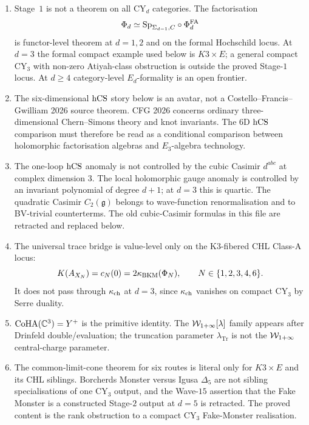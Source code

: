\begin{enumerate}
\item Stage~$1$ is not a theorem on all CY$_d$ categories.  The
factorisation
\[
\Phi_d \simeq \mathrm{Sp}_{\Sigma_{d-1}, C}\circ \Phi^{\mathrm{FA}}_d
\]
is functor-level theorem at $d = 1,2$ and on the formal Hochschild locus.
At $d = 3$ the formal compact example used below is $K3 \times E$; a
general compact CY$_3$ with non-zero Atiyah-class obstruction is outside
the proved Stage-$1$ locus.  At $d \geq 4$ category-level $E_d$-formality
is an open frontier.

\item The six-dimensional $\mathrm{hCS}$ story below is an avatar, not a
Costello--Francis--Gwilliam 2026 source theorem.  CFG 2026 concerns
ordinary three-dimensional Chern--Simons theory and knot invariants.  The
$6$D $\mathrm{hCS}$ comparison must therefore be read as a conditional comparison
between holomorphic factorisation algebras and $E_3$-algebra technology.

\item The one-loop $\mathrm{hCS}$ anomaly is not controlled by the cubic Casimir
$d^{abc}$ at complex dimension $3$.  The local holomorphic gauge anomaly
is controlled by an invariant polynomial of degree $d+1$; at $d=3$ this
is quartic.  The quadratic Casimir $C_2(\mathfrak g)$ belongs to
wave-function renormalisation and to BV-trivial counterterms.  The old
cubic-Casimir formulas in this file are retracted and replaced below.

\item The universal trace bridge is value-level only on the K3-fibered CHL
Class-A locus:
\[
K(A_{X_N}) = c_N(0) = 2\kappa_{\mathrm{BKM}}(\Phi_N),
\qquad N\in\{1,2,3,4,6\}.
\]
It does not pass through $\kappa_{\mathrm{ch}}$ at $d=3$, since $\kappa_{\mathrm{ch}}$ vanishes on compact
CY$_3$ by Serre duality.

\item $\mathrm{CoHA}(\mathbb{C}^3)=Y^+$ is the primitive identity.  The
$\mathcal{W}_{1+\infty}[\lambda]$ family appears after Drinfeld double/evaluation; the
truncation parameter $\lambda_{\mathrm{Tr}}$ is not the
$\mathcal{W}_{1+\infty}$ central-charge parameter.

\item The common-limit-cone theorem for six routes is literal only for
$K3\times E$ and its CHL siblings.  Borcherds Monster versus Igusa
$\Delta_5$ are not sibling specialisations of one CY$_3$ output, and the
Wave-$15$ assertion that the Fake Monster is a constructed Stage-$2$
output at $d=5$ is retracted.  The proved content is the rank obstruction
to a compact CY$_3$ Fake-Monster realisation.
\end{enumerate}

